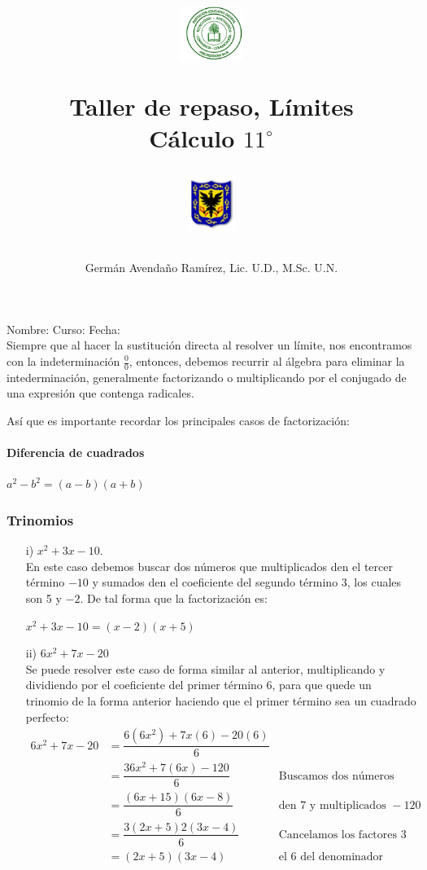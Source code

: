 \documentclass[10pt,twoside]{article}
\author{Germ\'an Avenda\~no Ram\'irez, Lic. U.D., M.Sc. U.N.}
\title{\begin{minipage}{.2\textwidth}
\includegraphics[height=1.75cm]{Images/logo-colegio.png}\end{minipage}
\begin{minipage}{.55\textwidth}
\begin{center}
Taller de repaso, Límites  \\
Cálculo $11^{\circ}$
\end{center}
\end{minipage}\hfill
\begin{minipage}{.2\textwidth}
\includegraphics[height=1.75cm]{Images/logo-sed.png} 
\end{minipage}}
\date{}
\begin{document}
\maketitle
Nombre: \hrulefill Curso: \underline{\hspace*{44pt}} Fecha: \underline{\hspace*{2.5cm}}\\

Siempre que al hacer la sustituci\'{o}n directa al resolver un l\'{i}mite, nos encontramos con la indeterminaci\'{o}n $\frac{0}{0}$, entonces, debemos recurrir al \'{a}lgebra para eliminar la intederminaci\'{o}n, generalmente factorizando o multiplicando por el conjugado de una expresi\'{o}n que contenga radicales.

Así que es importante recordar los principales casos de factorización:
\paragraph*{Diferencia de cuadrados}
$a^{2}-b^{2}=(a-b)(a+b)$
\subsubsection*{Trinomios} 
\begin{itemize}
\item[i)] $x^{2}+3x-10$.\\
En este caso debemos buscar dos números que multiplicados den el tercer término $-10$ y sumados den el coeficiente del segundo término $3$, los cuales son 5 y $-2$. De tal forma que la factorización es: 
\begin{center}
$x^{2}+3x-10=(x-2)(x+5)$
\end{center}
\item[ii)] $6x^{2}+7x-20$\\Se puede resolver este caso de forma similar al anterior, multiplicando y dividiendo por el coeficiente del primer término $6$, para que quede un trinomio de la forma anterior haciendo que el primer término sea un cuadrado perfecto:
\begin{align*}
6x^{2}+7x-20&=\dfrac{6(6x^{2})+7x(6)-20(6)}{6}\\
&=\dfrac{36x^{2}+7(6x)-120}{6} & \mbox{Buscamos dos n\'umeros que sumados}\\
&=\dfrac{(6x+15)(6x-8)}{6} & \mbox{den 7 y multiplicados }-120\\
&=\dfrac{3(2x+5)2(3x-4)}{6} & \mbox{Cancelamos los factores 3 y 2 con}\\
&=(2x+5)(3x-4) & \mbox{el 6 del denominador}
\end{align*}
\end{itemize}
\end{document}
